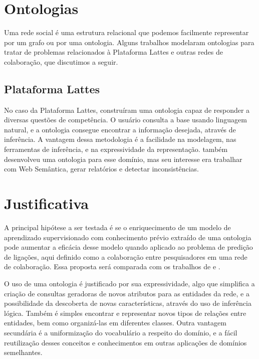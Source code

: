 \section{Ontologias}
\label{sec:ontologias}

Uma rede social é uma estrutura relacional que podemos facilmente representar por um grafo ou por uma ontologia. Alguns trabalhos modelaram ontologias para tratar de problemas relacionados à Plataforma Lattes e outras redes de colaboração, que discutimos a seguir.


\subsection{Plataforma Lattes}
\label{ssec:lattes}

No caso da Plataforma Lattes, \citet{Anaue2009} construíram uma ontologia capaz de responder a diversas questões de competência. O usuário consulta a base usando linguagem natural, e a ontologia consegue encontrar a informação desejada, através de inferência. A vantagem dessa metodologia é a facilidade na modelagem, nas ferramentas de inferência, e na
expressividade da representação. \citet{Galego2013} também desenvolveu uma ontologia para esse domínio, mas seu interesse era trabalhar com Web Semântica, gerar relatórios e detectar inconsistências.


\section{Justificativa}
\label{sec:justificativa}

A principal hipótese a ser testada é se o enriquecimento de um modelo de aprendizado supervisionado com conhecimento prévio extraído de uma ontologia pode aumentar a eficácia desse modelo quando aplicado ao problema de predição de ligações, aqui definido como a colaboração entre pesquisadores em uma rede de colaboração. Essa proposta será comparada com os trabalhos de \citet{MohammadAlHasan} e \cite{Cervantes2014}.

O uso de uma ontologia é justificado por sua expressividade, algo que simplifica a criação de consultas geradoras de novos atributos para as entidades da rede, e a possibilidade da descoberta de novas características, através do uso de inferência lógica. Também é simples encontrar e representar novos tipos de relações entre entidades, bem como organizá-las em diferentes classes. Outra vantagem secundária é a uniformização do vocabulário a respeito do domínio, e a fácil reutilização desses conceitos e conhecimentos em outras aplicações de domínios semelhantes.

